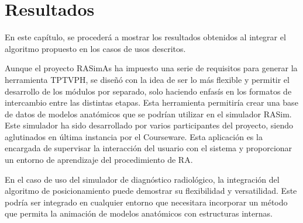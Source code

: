 \chapter{Resultados} 
\label{cap:results}

En este capítulo, se procederá a mostrar los resultados obtenidos al integrar el algoritmo propuesto en los casos de usos descritos. 

Aunque el proyecto \ac{RASimAs} ha impuesto una serie de requisitos para generar la herramienta \ac{TPTVPH}, se diseñó con la idea de ser lo más flexible y permitir el desarrollo de los módulos por separado, solo haciendo enfasís en los formatos de intercambio entre las distintas etapas. Esta herramienta permitiría crear una base de datos de modelos anatómicos que se podrían utilizar en el simulador \ac{RASim}. Este simulador ha sido desarrollado por varios participantes del proyecto, siendo aglutinados en última instancia por el \ac{Courseware}. Esta aplicación es la encargada de supervisar la interacción del usuario con el sistema y proporcionar un entorno de aprendizaje del procedimiento de \ac{RA}.

En el caso de uso del simulador de diagnóstico radiológico, la integración del algoritmo de posicionamiento puede demostrar su flexibilidad y versatilidad. Este podría ser integrado en cualquier entorno que necesitara incorporar un método que permita la animación de modelos anatómicos con estructuras internas.


